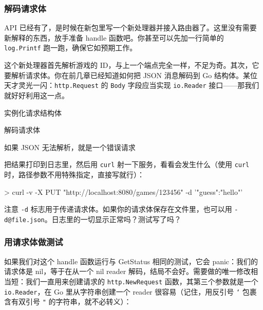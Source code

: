 \subsubsection*{解码请求体}

API 已经有了，是时候在新包里写一个新处理器并接入路由器了。这里没有需要新解释的东西，放手准备 handle 函数吧。你甚至可以先加一行简单的 \texttt{log.Printf} 跑一跑，确保它如预期工作。

这个新处理器首先解析游戏的 ID，与上一个端点完全一样，不足为奇。其次，它要解析请求体。你在前几章已经知道如何把 JSON 消息解码到 Go 结构体。某位天才灵光一闪：\texttt{http.Request} 的 \texttt{Body} 字段应当实现 \texttt{io.Reader} 接口——那我们就好好利用这一点。


\begin{codeannotations}
\item 实例化请求结构体
\item 解码请求体
\item 如果 JSON 无法解析，就是一个错误请求
\end{codeannotations}

把结果打印到日志里，然后用 \texttt{curl} 射一下服务，看看会发生什么（使用 \texttt{curl} 时，路径参数不用特殊指定，直接写就行）：

\begin{shellcode}[]
> curl -v -X PUT "http://localhost:8080/games/123456" -d '{"guess":"hello"}'
\end{shellcode}

注意 \texttt{-d} 标志用于传递请求体。如果你的请求体保存在文件里，也可以用 \texttt{-d@file.json}。日志里的一切显示正常吗？测试写了吗？

\subsubsection*{用请求体做测试}

如果我们对这个 handle 函数运行与 GetStatus 相同的测试，它会 panic：我们的请求体是 nil，等于在从一个 nil reader 解码，结局不会好。需要做的唯一修改相当短：我们一直用来创建请求的 \texttt{http.NewRequest} 函数，其第三个参数就是一个 \texttt{io.Reader}，在 Go 里从字符串创建一个 reader 很容易（记住，用反引号 \texttt{`} 包裹含有双引号 \texttt{"} 的字符串，就不必转义）：


